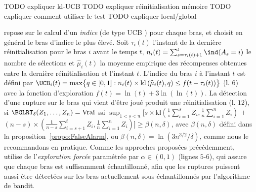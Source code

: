 \documentclass[11pt,english,ignorenonframetext,]{beamer}
\begin{document}
\begin{frame}

  TODO expliquer kl-UCB
  TODO expliquer réinitialisation mémoire
  TODO expliquer comment utiliser le test
  TODO expliquer local/global

  \GLRklUCB{} repose sur le calcul d'un \emph{indice} (de type UCB{} \cite{KLUCBJournal}) pour chaque bras,  et choisit en général le bras d'indice le plus élevé. Soit
  $\tau_i(t)$ l'instant de la dernière réinitialisation pour le bras $i$ avant le temps $t$, $n_i(t) = \sum_{s=\tau_i(t)+1}^{t} \ind(A_s=i)$ le nombre de sélections et $\widehat{\mu}_i(t)$
  la moyenne empirique des récompenses obtenues entre la dernière réinitialisation et l'instant $t$. L'indice du bras $i$ à l'instant $t$ est défini par
  $\UCB_i(t) = \max \bigl\{ q\in[0,1] : n_i(t) \times \mathrm{kl}\left(\widehat{\mu}_i(t),q\right) \leq f(t - \tau_i(t)) \bigr\}$ (l. $6$) avec la fonction d'exploration $f(t) = \ln(t) + 3 \ln(\ln(t))$.
  La détection d'une rupture sur le bras qui vient d'être joué
  produit une réinitialisation (l. $12$),
  si $\BGLRT_\delta(Z_1,\dots,Z_n) = \mathrm{Vrai}$ ssi
  $\sup_{1 < s < n} \bigl[s \times \mathrm{kl} \left(\frac{1}{s}\sum_{i=1}^s Z_i, \frac{1}{n} \sum_{i=1}^n Z_i\right)$ $+$ $(n-s) \times (\frac{1}{n-s}\sum_{i=s+1}^t Z_i, \frac{1}{n}\sum_{i=1}^n Z_i) \bigr] \geq \beta(n,\delta)$,
  avec $\beta(n,\delta)$ défini dans la proposition~\ref{propo:FalseAlarm}, ou $\beta(n,\delta) = \ln(3n^{3/2}/\delta)$, comme nous le recommandons en pratique. Comme les approches proposées précédemment,
  \GLRklUCB{} utilise de l'\emph{exploration forcée}
  paramétrée par $\alpha\in(0,1)$
  (lignes $5$-$6$), qui assure que chaque bras est suffisamment échantillonné, afin que les ruptures puissent aussi être détectées sur les bras actuellement sous-échantillonnés par l'algorithme de bandit.

\end{frame}
\end{document}

